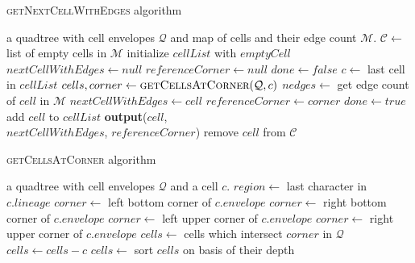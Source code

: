 \begin{algorithm}\caption{\textsc{getNextCellWithEdges} algorithm}\label{alg:one}
    \begin{algorithmic}[1]
    \Require a quadtree with cell envelopes $\mathcal Q$ and map of cells and their edge count $\mathcal M$.
        \State $\mathcal C \gets $ list of empty cells in $\mathcal M$
            \State initialize $cellList$ with $emptyCell$ 
            \State $nextCellWithEdges \gets null$
            \State $referenceCorner \gets null$
            \State $done \gets false$
                \State $c \gets $ last cell in $cellList$ 
                \State $cells, corner \gets \textsc{getCellsAtCorner}(\mathcal Q, c)$ 
                    \State $nedges \gets$ get edge count of $cell$ in $\mathcal M$ 
                        \State $nextCellWithEdges \gets cell$
                        \State $referenceCorner \gets corner$
                        \State $done \gets true$
                    \Else
                        \State add $cell$ to $cellList$
                    \EndIf
                \EndFor
            \EndWhile
                \State \textbf{output}($cell$, \\
                \hspace{2.5cm} $nextCellWithEdges$, $referenceCorner$)
                \State remove $cell$ from $\mathcal C$
            \EndFor
        \EndFor
    \EndFunction
    \end{algorithmic}
\end{algorithm}

\begin{algorithm} \caption{\textsc{getCellsAtCorner} algorithm}\label{alg:two}
    \begin{algorithmic}[1]
    \Require a quadtree with cell envelopes $\mathcal Q$ and a cell $c$.
        \State $region \gets $ last character in $c.lineage$
                \State $corner \gets$ left bottom corner of $c.envelope$
            \EndCase
                \State $corner \gets$ right bottom corner of $c.envelope$
            \EndCase
                \State $corner \gets$ left upper corner of $c.envelope$
            \EndCase
                \State $corner \gets$ right upper corner of $c.envelope$
            \EndCase
        \EndSwitch
        \State $cells \gets$ cells which intersect $corner$ in $\mathcal Q$
        \State $cells \gets cells - c$ 
        \State $cells \gets$ sort $cells$ on basis of their depth 
        \State {}
    \EndFunction
    \end{algorithmic}
\end{algorithm}

